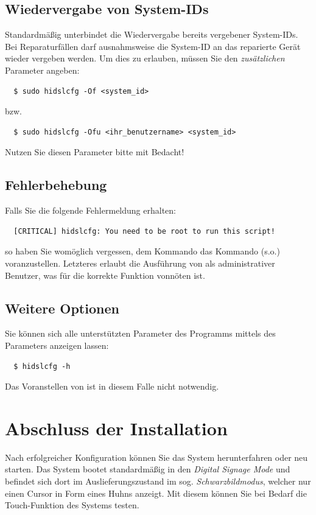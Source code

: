 \documentclass[a4paper,11pt,authoryear]{article}
\begin{document}
\subsection{Wiedervergabe von System-IDs}
Standardmäßig unterbindet  die Wiedervergabe bereits vergebener System-IDs.
Bei Reparaturfällen darf ausnahmsweise die System-ID an das reparierte Gerät wieder vergeben werden.
Um dies zu erlauben, müssen Sie den \emph{zusätzlichen} Parameter  angeben:
\begin{verbatim}
  $ sudo hidslcfg -Of <system_id>
\end{verbatim}
bzw.
\begin{verbatim}
  $ sudo hidslcfg -Ofu <ihr_benutzername> <system_id>
\end{verbatim}
Nutzen Sie diesen Parameter bitte mit Bedacht!

\subsection{Fehlerbehebung}
Falls Sie die folgende Fehlermeldung erhalten:
\begin{verbatim}
  [CRITICAL] hidslcfg: You need to be root to run this script!
\end{verbatim}
so haben Sie womöglich vergessen, dem Kommando  das Kommando  (s.o.) voranzustellen.
Letzteres erlaubt die Ausführung von  als administrativer Benutzer, was für die korrekte Funktion vonnöten ist.
\subsection{Weitere Optionen}
Sie können sich alle unterstützten Parameter des Programms  mittels des Parameters  anzeigen lassen:
\begin{verbatim}
  $ hidslcfg -h
\end{verbatim}
Das Voranstellen von  ist in diesem Falle nicht notwendig.

\section{Abschluss der Installation}
Nach erfolgreicher Konfiguration können Sie das System herunterfahren oder neu starten.
Das System bootet standardmäßig in den \emph{Digital Signage Mode} und befindet sich dort im Auslieferungszustand im sog. \emph{Schwarzbildmodus}, welcher nur einen Cursor in Form eines Huhns anzeigt.
Mit diesem können Sie bei Bedarf die Touch-Funktion des Systems testen.

{}

\end{document}
